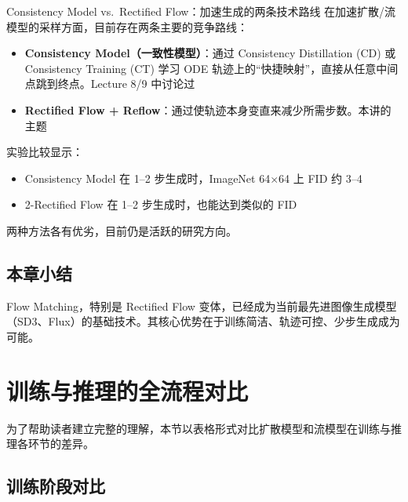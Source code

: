 \documentclass[a4paper]{article}
\begin{document}
\begin{knowledgebox}{Consistency Model vs.\ Rectified Flow：加速生成的两条技术路线}
在加速扩散/流模型的采样方面，目前存在两条主要的竞争路线：
\begin{itemize}
    \item \textbf{Consistency Model（一致性模型）}：通过 Consistency Distillation (CD) 或 Consistency Training (CT) 学习 ODE 轨迹上的``快捷映射''，直接从任意中间点跳到终点。Lecture 8/9 中讨论过
    \item \textbf{Rectified Flow + Reflow}：通过使轨迹本身变直来减少所需步数。本讲的主题
\end{itemize}

实验比较显示：
\begin{itemize}
    \item Consistency Model 在 1--2 步生成时，ImageNet 64$\times$64 上 FID 约 3--4
    \item 2-Rectified Flow 在 1--2 步生成时，也能达到类似的 FID
\end{itemize}
两种方法各有优劣，目前仍是活跃的研究方向。
\end{knowledgebox}

\subsection{本章小结}

Flow Matching，特别是 Rectified Flow 变体，已经成为当前最先进图像生成模型（SD3、Flux）的基础技术。其核心优势在于训练简洁、轨迹可控、少步生成成为可能。

\section{训练与推理的全流程对比}

为了帮助读者建立完整的理解，本节以表格形式对比扩散模型和流模型在训练与推理各环节的差异。

\subsection{训练阶段对比}
\end{document}
